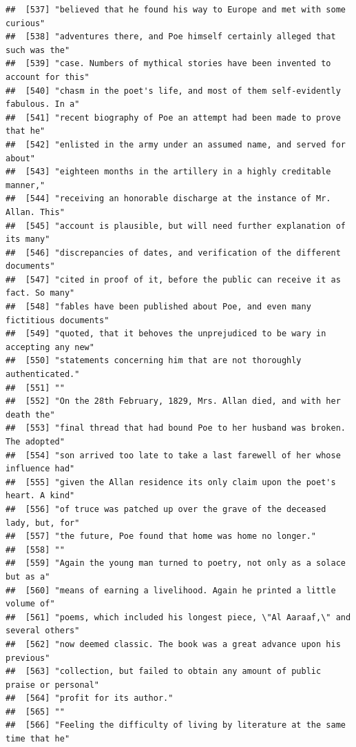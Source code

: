 \documentclass{article}\usepackage[]{graphicx}\usepackage[]{color}
\makeatletter
\newenvironment{kframe}{%
 \def\at@end@of@kframe{}%
 \ifinner\ifhmode%
  \def\at@end@of@kframe{\end{minipage}}%
  \begin{minipage}{\columnwidth}%
 \fi\fi%
 \def\FrameCommand##1{\hskip\@totalleftmargin \hskip-\fboxsep
 \colorbox{shadecolor}{##1}\hskip-\fboxsep
     \hskip-\linewidth \hskip-\@totalleftmargin \hskip\columnwidth}%
 \MakeFramed {\advance\hsize-\width
   \@totalleftmargin\z@ \linewidth\hsize
   \@setminipage}}%
 {\par\unskip\endMakeFramed%
 \at@end@of@kframe}
\newenvironment{knitrout}{}{} %
\makeatother
\begin{document}
\begin{knitrout}
\begin{kframe}
\begin{verbatim}
##  [537] "believed that he found his way to Europe and met with some curious"          
##  [538] "adventures there, and Poe himself certainly alleged that such was the"       
##  [539] "case. Numbers of mythical stories have been invented to account for this"    
##  [540] "chasm in the poet's life, and most of them self-evidently fabulous. In a"    
##  [541] "recent biography of Poe an attempt had been made to prove that he"           
##  [542] "enlisted in the army under an assumed name, and served for about"            
##  [543] "eighteen months in the artillery in a highly creditable manner,"             
##  [544] "receiving an honorable discharge at the instance of Mr. Allan. This"         
##  [545] "account is plausible, but will need further explanation of its many"         
##  [546] "discrepancies of dates, and verification of the different documents"         
##  [547] "cited in proof of it, before the public can receive it as fact. So many"     
##  [548] "fables have been published about Poe, and even many fictitious documents"    
##  [549] "quoted, that it behoves the unprejudiced to be wary in accepting any new"    
##  [550] "statements concerning him that are not thoroughly authenticated."            
##  [551] ""                                                                            
##  [552] "On the 28th February, 1829, Mrs. Allan died, and with her death the"         
##  [553] "final thread that had bound Poe to her husband was broken. The adopted"      
##  [554] "son arrived too late to take a last farewell of her whose influence had"     
##  [555] "given the Allan residence its only claim upon the poet's heart. A kind"      
##  [556] "of truce was patched up over the grave of the deceased lady, but, for"       
##  [557] "the future, Poe found that home was home no longer."                         
##  [558] ""                                                                            
##  [559] "Again the young man turned to poetry, not only as a solace but as a"         
##  [560] "means of earning a livelihood. Again he printed a little volume of"          
##  [561] "poems, which included his longest piece, \"Al Aaraaf,\" and several others"  
##  [562] "now deemed classic. The book was a great advance upon his previous"          
##  [563] "collection, but failed to obtain any amount of public praise or personal"    
##  [564] "profit for its author."                                                      
##  [565] ""                                                                            
##  [566] "Feeling the difficulty of living by literature at the same time that he"     

\end{verbatim}
\end{kframe}
\end{knitrout}
\end{document}
